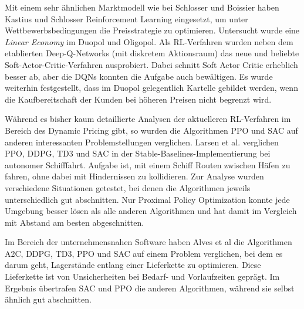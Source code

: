 Mit einem sehr ähnlichen Marktmodell wie bei Schlosser und Boissier haben Kastius und Schlosser \cite{Kastius2022} Reinforcement Learning eingesetzt, um unter Wettbewerbsbedingungen die Preisstrategie zu optimieren.
Untersucht wurde eine \textit{Linear Economy} im Duopol und Oligopol.
Als RL-Verfahren wurden neben dem etablierten Deep-Q-Networks (mit diskretem Aktionsraum) das neue und beliebte Soft-Actor-Critic-Verfahren ausprobiert.
Dabei schnitt Soft Actor Critic erheblich besser ab, aber die DQNs konnten die Aufgabe auch bewältigen.
Es wurde weiterhin festgestellt, dass im Duopol gelegentlich Kartelle gebildet werden, wenn die Kaufbereitschaft der Kunden bei höheren Preisen nicht begrenzt wird.

Während es bisher kaum detaillierte Analysen der aktuelleren RL-Verfahren im Bereich des Dynamic Pricing gibt, so wurden die Algorithmen PPO und SAC auf anderen interessanten Problemstellungen verglichen.
Larsen et al. verglichen PPO, DDPG, TD3 und SAC in der Stable-Baselines-Implementierung bei autonomer Schifffahrt.
Aufgabe ist, mit einem Schiff Routen zwischen Häfen zu fahren, ohne dabei mit Hindernissen zu kollidieren.
Zur Analyse wurden verschiedene Situationen getestet, bei denen die Algorithmen jeweils unterschiedlich gut abschnitten.
Nur Proximal Policy Optimization konnte jede Umgebung besser lösen als alle anderen Algorithmen und hat damit im Vergleich mit Abstand am besten abgeschnitten.

Im Bereich der unternehmensnahen Software haben Alves et al \cite{10.1007/978-3-030-87897-9_21} die Algorithmen A2C, DDPG, TD3, PPO und SAC auf einem Problem verglichen, bei dem es darum geht, Lagerstände entlang einer Lieferkette zu optimieren.
Diese Lieferkette ist von Unsicherheiten  bei Bedarf- und Vorlaufzeiten geprägt.
Im Ergebnis übertrafen SAC und PPO die anderen Algorithmen, während sie selbst ähnlich gut abschnitten.